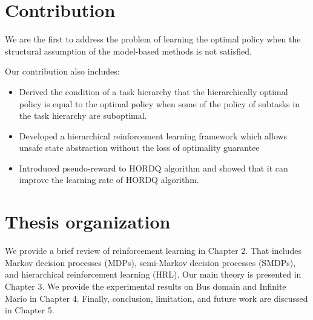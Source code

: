 \section{Contribution}
We are the first to address the problem of learning the optimal policy when
the structural assumption of the model-based methods is not satisfied.

Our contribution also includes: 
\begin{itemize}
\item Derived the condition of a task hierarchy that the hierarchically optimal policy is equal to
      the optimal policy when some of the policy of subtasks in the task hierarchy are suboptimal.
\item Developed a hierarchical reinforcement learning framework which allows unsafe state abstraction
      without the loss of optimality guarantee
\item Introduced pseudo-reward to HORDQ algorithm and showed that it can improve
      the learning rate of HORDQ algorithm. 
\end{itemize}

\section{Thesis organization}
We provide a brief review of reinforcement learning in Chapter 2. 
That includes Markov decision processes (MDPs), semi-Markov decision processes (SMDPs),
and hierarchical reinforcement learning (HRL).
Our main theory is presented in Chapter 3. 
We provide the experimental results on Bus domain and Infinite Mario in Chapter 4.
Finally, conclusion, limitation, and future work are discussed in Chapter 5.


